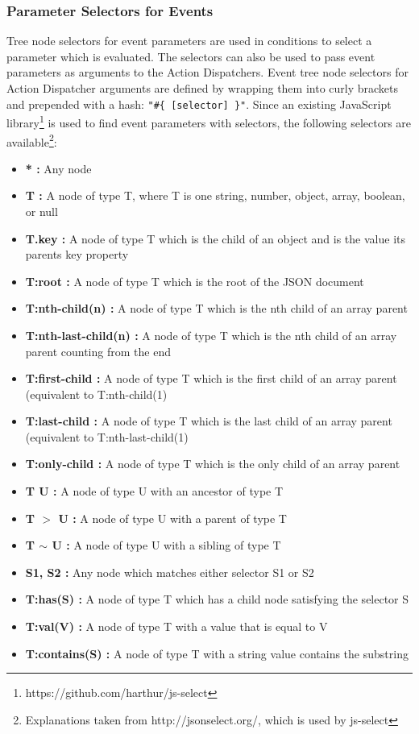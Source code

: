 \subsubsection{Parameter Selectors for Events}
Tree node selectors for event parameters are used in conditions to select a parameter which is evaluated.
The selectors can also be used to pass event parameters as arguments to the \textrm{Action Dispatchers}.
Event tree node selectors for \textrm{Action Dispatcher} arguments are defined by wrapping them into curly brackets and prepended with a hash: \texttt{"\#\{ [selector] \}"}.
Since an existing \textrm{JavaScript} library\footnote{https://github.com/harthur/js-select} is used to find event parameters with selectors, the following selectors are available\footnote{Explanations taken from http://jsonselect.org/, which is used by js-select}:
\begin{itemize}
	\item \textrm{\textbf{* :}}	Any node
	\item \textrm{\textbf{T :}}	A node of type T, where T is one string, number, object, array, boolean, or null
	\item \textrm{\textbf{T.key :}}	A node of type T which is the child of an object and is the value its parents key property
	\item \textrm{\textbf{T:root :}}	A node of type T which is the root of the JSON document
	\item \textrm{\textbf{T:nth-child(n) :}}	A node of type T which is the nth child of an array parent
	\item \textrm{\textbf{T:nth-last-child(n) :}}	A node of type T which is the nth child of an array parent counting from the end
	\item \textrm{\textbf{T:first-child :}}	A node of type T which is the first child of an array parent (equivalent to T:nth-child(1)
	\item \textrm{\textbf{T:last-child :}}	A node of type T which is the last child of an array parent (equivalent to T:nth-last-child(1)
	\item \textrm{\textbf{T:only-child :}}	A node of type T which is the only child of an array parent
	\item \textrm{\textbf{T U :}}	A node of type U with an ancestor of type T
	\item \textrm{\textbf{T $>$ U :}}	A node of type U with a parent of type T
	\item \textrm{\textbf{T $\sim$ U :}}	A node of type U with a sibling of type T
	\item \textrm{\textbf{S1, S2 :}}	Any node which matches either selector S1 or S2
	\item \textrm{\textbf{T:has(S) :}}	A node of type T which has a child node satisfying the selector S
	\item \textrm{\textbf{T:val(V) :}}	A node of type T with a value that is equal to V
	\item \textrm{\textbf{T:contains(S) :}}	A node of type T with a string value contains the substring
\end{itemize}

